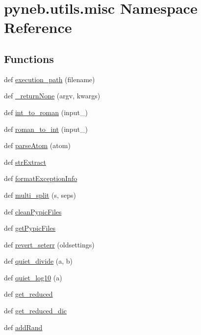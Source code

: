 \hypertarget{namespacepyneb_1_1utils_1_1misc}{}\section{pyneb.\+utils.\+misc Namespace Reference}
\label{namespacepyneb_1_1utils_1_1misc}
\subsection*{Functions}
\begin{DoxyCompactItemize}
\item 
def \hyperlink{namespacepyneb_1_1utils_1_1misc_a0e9572755930aabb03c6b0e5d66b8356}{execution\+\_\+path} (filename)
\item 
def \hyperlink{namespacepyneb_1_1utils_1_1misc_adca84ea86408b88ee4f54583e19d4a18}{\+\_\+return\+None} (argv, kwargs)
\item 
def \hyperlink{namespacepyneb_1_1utils_1_1misc_aec4e973d4cb9299f749ef190ea636a06}{int\+\_\+to\+\_\+roman} (input\+\_\+)
\item 
def \hyperlink{namespacepyneb_1_1utils_1_1misc_a97329c3ce57bd870421672b90e3e6541}{roman\+\_\+to\+\_\+int} (input\+\_\+)
\item 
def \hyperlink{namespacepyneb_1_1utils_1_1misc_a8c069186002a3e73dd474958e35034d5}{parse\+Atom} (atom)
\item 
def \hyperlink{namespacepyneb_1_1utils_1_1misc_aaf9c5249e3c3104e38854ca30f9df4b7}{str\+Extract}
\item 
def \hyperlink{namespacepyneb_1_1utils_1_1misc_ab2eb7efdb086136e683e7f05f17958a9}{format\+Exception\+Info}
\item 
def \hyperlink{namespacepyneb_1_1utils_1_1misc_a4fc4f061f0c41f29de52ec765f894faf}{multi\+\_\+split} (s, seps)
\item 
def \hyperlink{namespacepyneb_1_1utils_1_1misc_a71fea98dc66e2a1793b5c86a345da052}{clean\+Pypic\+Files}
\item 
def \hyperlink{namespacepyneb_1_1utils_1_1misc_aee812eafa08b828b4c65c700a6cf4ff6}{get\+Pypic\+Files}
\item 
def \hyperlink{namespacepyneb_1_1utils_1_1misc_adadbbcc030d1e6da419e5c7af03f5a2d}{revert\+\_\+seterr} (oldsettings)
\item 
def \hyperlink{namespacepyneb_1_1utils_1_1misc_afa4163f24be7b1472200c24824c72ae1}{quiet\+\_\+divide} (a, b)
\item 
def \hyperlink{namespacepyneb_1_1utils_1_1misc_ad7f2bfdb7125df3d6a57156deb181179}{quiet\+\_\+log10} (a)
\item 
def \hyperlink{namespacepyneb_1_1utils_1_1misc_ae69de9c9e8f8bde114b8edd326f3b993}{get\+\_\+reduced}
\item 
def \hyperlink{namespacepyneb_1_1utils_1_1misc_ad6fc4e32ea4c076ac81e99b5c1e74f13}{get\+\_\+reduced\+\_\+dic}
\item 
def \hyperlink{namespacepyneb_1_1utils_1_1misc_af39dcb3c2627e5f29063e47ca4327f94}{add\+Rand}
\end{DoxyCompactItemize}


